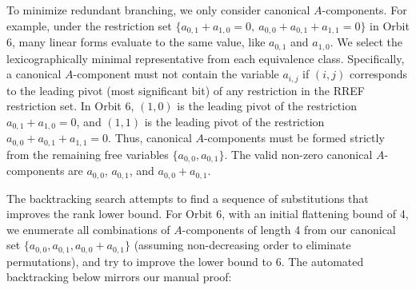 \documentclass[11pt]{article}
\begin{document}
To minimize redundant branching, we only consider canonical $A$-components. For example, under the restriction set $\{a_{0,1}+a_{1,0}=0,\ a_{0,0}+a_{0,1}+a_{1,1}=0\}$ in Orbit 6, many linear forms evaluate to the same value, like $a_{0,1}$ and $a_{1,0}$. We select the lexicographically minimal representative from each equivalence class. Specifically, a canonical $A$-component must not contain the variable $a_{i,j}$ if $(i,j)$ corresponds to the leading pivot (most significant bit) of any restriction in the RREF restriction set. In Orbit 6, $(1,0)$ is the leading pivot of the restriction $a_{0,1}+a_{1,0}=0$, and $(1,1)$ is the leading pivot of the restriction $a_{0,0}+a_{0,1}+a_{1,1}=0$. Thus, canonical $A$-components must be formed strictly from the remaining free variables $\{a_{0,0}, a_{0,1}\}$. The valid non-zero canonical $A$-components are $a_{0,0}$, $a_{0,1}$, and $a_{0,0}+a_{0,1}$.

The backtracking search attempts to find a sequence of substitutions that improves the rank lower bound. For Orbit 6, with an initial flattening bound of 4, we enumerate all combinations of $A$-components of length 4 from our canonical set $\{a_{0,0}, a_{0,1}, a_{0,0}+a_{0,1}\}$ (assuming non-decreasing order to eliminate permutations), and try to improve the lower bound to 6. The automated backtracking below mirrors our manual proof:
\end{document}

